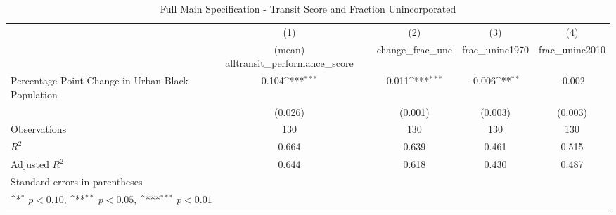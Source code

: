 \begin{table}[htbp]\centering
\def\sym#1{\ifmmode^{#1}\else\(^{#1}\)\fi}
\caption{Full Main Specification - Transit Score and Fraction Unincorporated}
\begin{tabular}{l*{4}{c}}
\hline\hline
                    &\multicolumn{1}{c}{(1)}&\multicolumn{1}{c}{(2)}&\multicolumn{1}{c}{(3)}&\multicolumn{1}{c}{(4)}\\
                    &\multicolumn{1}{c}{(mean) alltransit\_performance\_score}&\multicolumn{1}{c}{change\_frac\_unc}&\multicolumn{1}{c}{frac\_uninc1970}&\multicolumn{1}{c}{frac\_uninc2010}\\
\hline
Percentage Point Change in Urban Black Population&       0.104\sym{***}&       0.011\sym{***}&      -0.006\sym{**} &      -0.002         \\
                    &     (0.026)         &     (0.001)         &     (0.003)         &     (0.003)         \\
\hline
Observations        &         130         &         130         &         130         &         130         \\
\(R^{2}\)           &       0.664         &       0.639         &       0.461         &       0.515         \\
Adjusted \(R^{2}\)  &       0.644         &       0.618         &       0.430         &       0.487         \\
\hline\hline
\multicolumn{5}{l}{\footnotesize Standard errors in parentheses}\\
\multicolumn{5}{l}{\footnotesize \sym{*} \(p<0.10\), \sym{**} \(p<0.05\), \sym{***} \(p<0.01\)}\\
\end{tabular}
\end{table}
